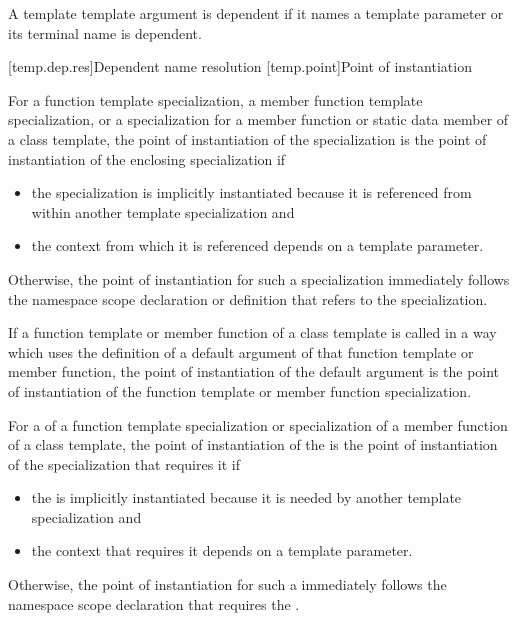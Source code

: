 \pnum
A template template argument is dependent if
it names a template parameter or
its terminal name is dependent.

[temp.dep.res]{Dependent name resolution}
[temp.point]{Point of instantiation}

\pnum
{}%
For a function template specialization, a member function template
specialization, or a specialization for a member function or static data member
of a class template,
the point of instantiation of the specialization is the point of instantiation
of the enclosing specialization if
\begin{itemize}
\item the specialization is implicitly instantiated
because it is referenced from within another template specialization and
\item the context from which it is referenced depends on a template parameter.
\end{itemize}
Otherwise, the point of instantiation for such a specialization immediately
follows the namespace scope declaration
or definition that refers to the specialization.

\pnum
If a function template or member function of a class template is called
in a way which uses the definition of a default argument of that function
template or member function,
the point of instantiation of the default argument is the point of
instantiation of the function template or member function specialization.

\pnum
For a  of a function template
specialization or specialization of a member function of a class template,
the point of instantiation of the
 is the point of instantiation of the
specialization that requires it if
\begin{itemize}
\item the  is implicitly instantiated
because it is needed by another template specialization and
\item the context that requires it depends on a template parameter.
\end{itemize}
Otherwise, the point of instantiation for such
a  immediately follows the namespace
scope declaration that requires the
.

